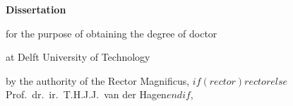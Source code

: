 \begin{titlepage}

    \begin{center}

        \vspace*{2\bigskipamount}

        {\makeatletter
            \titlestyle\bfseries\LARGE\@title
            \makeatother}

        {\makeatletter
            \ifx\@subtitle\undefined\else
                \bigskip
                \titlefont\titleshape\Large\@subtitle
            \fi
            \makeatother}

    \end{center}

    \cleardoublepage
    \thispagestyle{empty}

    \begin{center}


        \vspace*{2\bigskipamount}

        {\makeatletter
            \titlestyle\bfseries\LARGE\@title
            \makeatother}

        {\makeatletter
            \ifx\@subtitle\undefined\else
                \bigskip
                \titlefont\titleshape\Large\@subtitle
            \fi
            \makeatother}

        \vfill


        {\Large\titlefont\bfseries Dissertation}

        \bigskip
        \bigskip

        for the purpose of obtaining the degree of doctor

        at Delft University of Technology

        by the authority of the Rector Magnificus, $if(rector)$$rector$$else$Prof.~dr.~ir.~T.H.J.J.~van der Hagen$endif$,


\end{center}
\end{titlepage}
